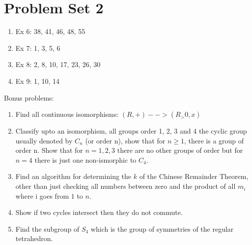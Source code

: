 \pagebreak
\section*{Problem Set 2}
\hypertarget{ModernAlgebra-Assignment02}{}

\begin{enumerate}
    \item{Ex 6: 38, 41, 46, 48, 55}
    \item{Ex 7: 1, 3, 5, 6}
    \item{Ex 8: 2, 8, 10, 17, 23, 26, 30}
    \item{Ex 9: 1, 10, 14}
\end{enumerate}

Bonus problems:
\begin{enumerate}
    \item{Find all continuous isomorphisms: $ (R,+) --> (R_>0,x) $}
    \item{Classify upto an isomorphism, all groups order 1, 2, 3 and 4 the cyclic group usually denoted by $ C_n $ (or order n), show that for $ n \ge 1 $, there is a group of order n. Show that for $ n = 1, 2, 3 $ there are no other groups of order but for $ n = 4 $ there is just one non-ismorphic to $ C_4 $.}
    \item{Find an algorithm for determining the $ k $ of the Chinese Remainder Theorem, other than just checking all numbers between zero and the product of all $ m_i $ where i goes from $ 1 $ to $ n $.}
    \item{Show if two cycles intersect then they do not commute.}
    \item{Find the subgroup of $ S_4 $ which is the group of symmetries of the regular tetrahedron.}
\end{enumerate}
